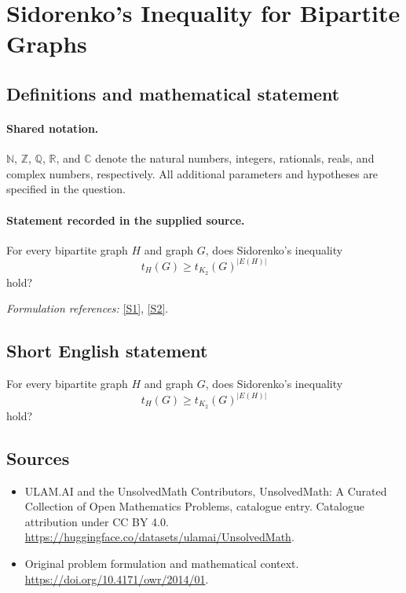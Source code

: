 \documentclass[11pt]{article}
\newcommand{\sref}[2]{\hyperlink{source:#1:#2}{[S#2]}}
\begin{document}
\section{Sidorenko's Inequality for Bipartite Graphs}\label{statement}

\subsection{Definitions and mathematical statement}

\paragraph{Shared notation.}$\mathbb N$, $\mathbb Z$, $\mathbb Q$, $\mathbb R$, and $\mathbb C$ denote the natural numbers, integers, rationals, reals, and complex numbers, respectively. All additional parameters and hypotheses are specified in the question.


\paragraph{Statement recorded in the supplied source.}
For every bipartite graph $H$ and graph $G$, does Sidorenko's inequality
$$t_H(G)\geq t_{K_2}(G)^{|E(H)|}$$
hold?
\par\smallskip\textit{Formulation references:} \sref{statement}{1}, \sref{statement}{2}.
\subsection{Short English statement}
For every bipartite graph $H$ and graph $G$, does Sidorenko's inequality
$$t_H(G)\geq t_{K_2}(G)^{|E(H)|}$$
hold?
\subsection{Sources}
\begin{itemize}
\item[\hypertarget{source:statement:1}{S1}] ULAM.AI and the UnsolvedMath Contributors, UnsolvedMath: A Curated Collection of Open Mathematics Problems, catalogue entry. Catalogue attribution under CC BY 4.0.
\url{https://huggingface.co/datasets/ulamai/UnsolvedMath}.
\item[\hypertarget{source:statement:2}{S2}] Original problem formulation and mathematical context.
\url{https://doi.org/10.4171/owr/2014/01}.
\end{itemize}
\label{end:statement}
\end{document}
